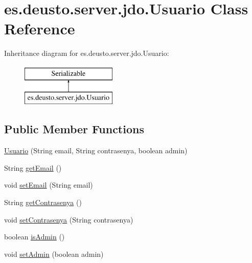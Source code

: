 \hypertarget{classes_1_1deusto_1_1server_1_1jdo_1_1_usuario}{}\section{es.\+deusto.\+server.\+jdo.\+Usuario Class Reference}
\label{classes_1_1deusto_1_1server_1_1jdo_1_1_usuario}
Inheritance diagram for es.\+deusto.\+server.\+jdo.\+Usuario\+:\begin{figure}[H]
\begin{center}
\leavevmode
\includegraphics[height=2.000000cm]{classes_1_1deusto_1_1server_1_1jdo_1_1_usuario}
\end{center}
\end{figure}
\subsection*{Public Member Functions}
\begin{DoxyCompactItemize}
\item 
\mbox{\hyperlink{classes_1_1deusto_1_1server_1_1jdo_1_1_usuario_a36dcf2ec08beb7556dc0fa87021858b4}{Usuario}} (String email, String contrasenya, boolean admin)
\item 
String \mbox{\hyperlink{classes_1_1deusto_1_1server_1_1jdo_1_1_usuario_ae69683ebc51198e0a51b722f899966b1}{get\+Email}} ()
\item 
void \mbox{\hyperlink{classes_1_1deusto_1_1server_1_1jdo_1_1_usuario_a21f39f8557815c50c81baf11b13c666f}{set\+Email}} (String email)
\item 
String \mbox{\hyperlink{classes_1_1deusto_1_1server_1_1jdo_1_1_usuario_a403b76f4c0be066f748d66b418254b69}{get\+Contrasenya}} ()
\item 
void \mbox{\hyperlink{classes_1_1deusto_1_1server_1_1jdo_1_1_usuario_ab2789f5232b3b9c39aa0802c8c231f8b}{set\+Contrasenya}} (String contrasenya)
\item 
boolean \mbox{\hyperlink{classes_1_1deusto_1_1server_1_1jdo_1_1_usuario_af454af693afdc7bad678ab1e24462fc3}{is\+Admin}} ()
\item 
void \mbox{\hyperlink{classes_1_1deusto_1_1server_1_1jdo_1_1_usuario_aa1d1a771be8e17f37076b9f8a29f4cd4}{set\+Admin}} (boolean admin)
\end{DoxyCompactItemize}


